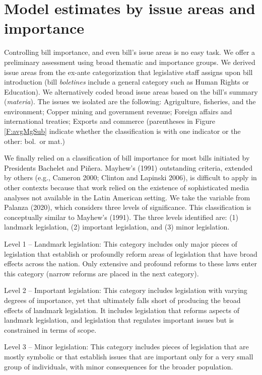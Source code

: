 \documentclass[letter,12pt]{article}
\begin{document}
  
\section{Model estimates by issue areas and importance}

Controlling bill importance, and even bill's issue areas is no easy task. We offer a preliminary assessment using broad thematic and importance groups. We derived issue areas from the ex-ante categorization that legislative staff assigns upon bill introduction (bill \emph{boletines} include a general category such as Human Rights or Education). We alternatively coded broad issue areas based on the bill's summary (\emph{materia}). The issues we isolated are the following: Agrigulture, fisheries, and the environment; Copper mining and government revenue; Foreign affairs and international treaties; Exports and commerce (parentheses in Figure \ref{F:avgMgSub} indicate whether the classification is with one indicator or the other: bol.\ or mat.) 

We finally relied on a classification of bill importance for most bills initiated by Presidents Bachelet and Piñera. Mayhew’s (1991) outstanding criteria, extended by others (e.g., Cameron 2000; Clinton and Lapinski 2006), is difficult to apply in other contexts because that work relied on the existence of sophisticated media analyses not available in the Latin American setting. We take the variable from Palanza (2020), which considers three levels of significance. This classification is conceptually similar to Mayhew's (1991). 
The three levels identified are: (1) landmark legislation, (2) important legislation, and (3) minor legislation. 

Level 1 – Landmark legislation: This category includes only major pieces of legislation that establish or profoundly reform areas of legislation that have broad effects across the nation. Only extensive and profound reforms to these laws enter this category (narrow reforms are placed in the next category). 

Level 2 – Important legislation: This category includes legislation with varying degrees of importance, yet that ultimately falls short of producing the broad effects of landmark legislation. It includes legislation that reforms aspects of landmark legislation, and legislation that regulates important issues but is constrained in terms of scope. 

Level 3 – Minor legislation: This category includes pieces of legislation that are mostly symbolic or that establish issues that are important only for a very small group of individuals, with minor consequences for the broader population. 
\end{document}
